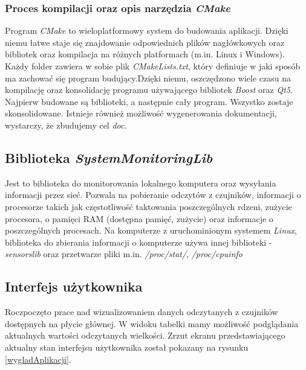 \documentclass[a4paper]{article}
\begin{document}
\subsubsection{Proces kompilacji oraz opis narzędzia \textit{CMake}}
Program \textit{CMake} to wieloplatformowy system do budowania aplikacji. Dzięki niemu łatwe staje się
znajdowanie odpowiednich plików nagłówkowych oraz bibliotek oraz kompilacja na różnych platformach (m.in. Linux i Windows). Każdy folder zawiera w sobie plik \textit{CMakeLists.txt}, który definiuje w jaki sposób ma zachować się program budujący.Dzięki niemu, oszczędzono wiele czasu na kompilację oraz konsolidację programu używającego bibliotek \textit{Boost} oraz \textit{Qt5}. Najpierw budowane są biblioteki, a następnie cały program. Wszystko zostaje skonsolidowane. Istnieje również możliwość wygenerowania dokumentacji, wystarczy, że zbudujemy cel \textit{doc}.

\subsection{Biblioteka \textit{SystemMonitoringLib}}
Jest to biblioteka do monitorowania lokalnego komputera oraz wysyłania informacji przez sieć. Pozwala na pobieranie odczytów z czujników, informacji o procesorze takich jak częstotliwość taktowania poszczególnych rdzeni, zużycie procesora, o pamięci RAM (dostępna pamięć, zużycie) oraz informacje o poszczególnych procesach. Na komputerze z uruchominionym systemem \textit{Linux}, biblioteka do zbierania informacji o komputerze używa innej biblioteki - \textit{sensorslib} oraz przetwarze pliki m.in. \textit{/proc/stat/}, \textit{/proc/cpuinfo}

\subsection{Interfejs użytkownika}
Roczpoczęto prace nad wizualizowaniem danych  odczytanych z czujników dostępnych na płycie głównej.
W widoku tabelki mamy możliwość podglądania aktualnych wartości odczytanych wielkości. Zrzut ekranu przedstawiającego aktualny stan interfejsu użytkownika został pokazany na rysunku \ref{wygladAplikacji}.
\end{document}
